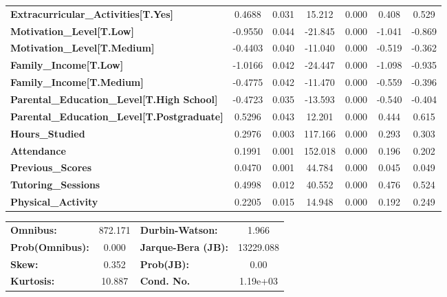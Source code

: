 \documentclass[11pt]{article}
\begin{document}
\begin{center}
\begin{tabular}{lcccccc}
\textbf{Extracurricular\_Activities[T.Yes]}         &       0.4688  &        0.031     &    15.212  &         0.000        &        0.408    &        0.529     \\
\textbf{Motivation\_Level[T.Low]}                   &      -0.9550  &        0.044     &   -21.845  &         0.000        &       -1.041    &       -0.869     \\
\textbf{Motivation\_Level[T.Medium]}                &      -0.4403  &        0.040     &   -11.040  &         0.000        &       -0.519    &       -0.362     \\
\textbf{Family\_Income[T.Low]}                      &      -1.0166  &        0.042     &   -24.447  &         0.000        &       -1.098    &       -0.935     \\
\textbf{Family\_Income[T.Medium]}                   &      -0.4775  &        0.042     &   -11.470  &         0.000        &       -0.559    &       -0.396     \\
\textbf{Parental\_Education\_Level[T.High School]}  &      -0.4723  &        0.035     &   -13.593  &         0.000        &       -0.540    &       -0.404     \\
\textbf{Parental\_Education\_Level[T.Postgraduate]} &       0.5296  &        0.043     &    12.201  &         0.000        &        0.444    &        0.615     \\
\textbf{Hours\_Studied}                             &       0.2976  &        0.003     &   117.166  &         0.000        &        0.293    &        0.303     \\
\textbf{Attendance}                                 &       0.1991  &        0.001     &   152.018  &         0.000        &        0.196    &        0.202     \\
\textbf{Previous\_Scores}                           &       0.0470  &        0.001     &    44.784  &         0.000        &        0.045    &        0.049     \\
\textbf{Tutoring\_Sessions}                         &       0.4998  &        0.012     &    40.552  &         0.000        &        0.476    &        0.524     \\
\textbf{Physical\_Activity}                         &       0.2205  &        0.015     &    14.948  &         0.000        &        0.192    &        0.249     \\
\bottomrule
\end{tabular}
\begin{tabular}{lclc}
\textbf{Omnibus:}       & 872.171 & \textbf{  Durbin-Watson:     } &     1.966  \\
\textbf{Prob(Omnibus):} &   0.000 & \textbf{  Jarque-Bera (JB):  } & 13229.088  \\
\textbf{Skew:}          &   0.352 & \textbf{  Prob(JB):          } &      0.00  \\
\textbf{Kurtosis:}      &  10.887 & \textbf{  Cond. No.          } &  1.19e+03  \\
\bottomrule
\end{tabular}
\end{center}
\end{document}
